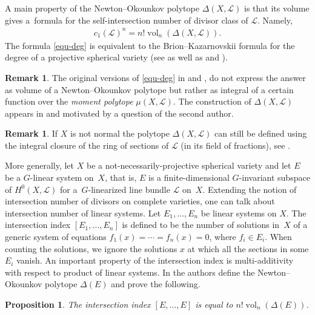 \documentclass[10pt,a4paper]{amsart}
\def \vol{\operatorname{vol}}
\numberwithin{equation}{section}
\newtheorem{Prop}[Th]{Proposition}
\theoremstyle{definition}
\newtheorem{Rem}[Th]{Remark}
\begin{document}
A main property of the Newton--Okounkov polytope $\Delta(X, {\mathcal L})$ is that its volume gives a~formula for the self-intersection number of divisor class of ${\mathcal L}$. Namely,
\begin{gather} \label{equ-deg}
c_1({\mathcal L})^n = n! \vol_n(\Delta(X, {\mathcal L})).
\end{gather}
The formula \eqref{equ-deg} is equivalent to the Brion--Kazarnovskii formula for the degree of a projective spherical variety (see \cite[Theorem~2.5]{Kaveh-note} as well as \cite{Kazarnovskii} and \cite{Brion}).

\begin{Rem} \label{rem-Brion-Kaz-original-statement}
The original versions of \eqref{equ-deg} in \cite{Kazarnovskii} and \cite{Brion}, do not express the answer as volume of a Newton--Okounkov polytope but rather as integral of a certain function over the {\it moment polytope} $\mu(X, {\mathcal L})$. The construction of $\Delta(X, {\mathcal L})$ appears in \cite{Okounkov-sph} and \cite{AB} motivated by a question of the second author.
\end{Rem}

\begin{Rem} \label{rem-not-normal}
If $X$ is not normal the polytope $\Delta(X, {\mathcal L})$ can still be defined using the integral closure of the ring of sections of ${\mathcal L}$ (in its field of fractions), see \cite[Section~6.2]{KKh-reductive}.
\end{Rem}

More generally, let $X$ be a not-necessarily-projective spherical variety and let $E$ be a $G$-linear system on~$X$, that is, $E$ is a finite-dimensional $G$-invariant subspace of $H^0(X, {\mathcal L})$ for a~$G$-linearized line bundle ${\mathcal L}$ on~$X$. Extending the notion of intersection number of divisors on complete varieties, one can talk about intersection number of linear systems. Let $E_1, \ldots, E_n$ be linear systems on $X$. The intersection index $[E_1, \ldots , E_n]$ is defined to be the number of solutions in~$X$ of a generic system of equations $f_1(x) = \cdots = f_n(x) = 0$, where $f_i \in E_i$. When counting the solutions, we ignore the solutions $x$ at which all the sections in some $E_i$ vanish. An important property of the intersection index is multi-additivity with respect to product of linear systems. In \cite[Section~6]{KKh-reductive} the authors define the Newton--Okounkov polytope $\Delta(E)$ and prove the following.

\begin{Prop} \label{prop-Brion-Kaz-linear-system}
The intersection index $[E, \ldots, E]$ is equal to $n! \vol_n(\Delta(E))$.
\end{Prop}
\end{document}
